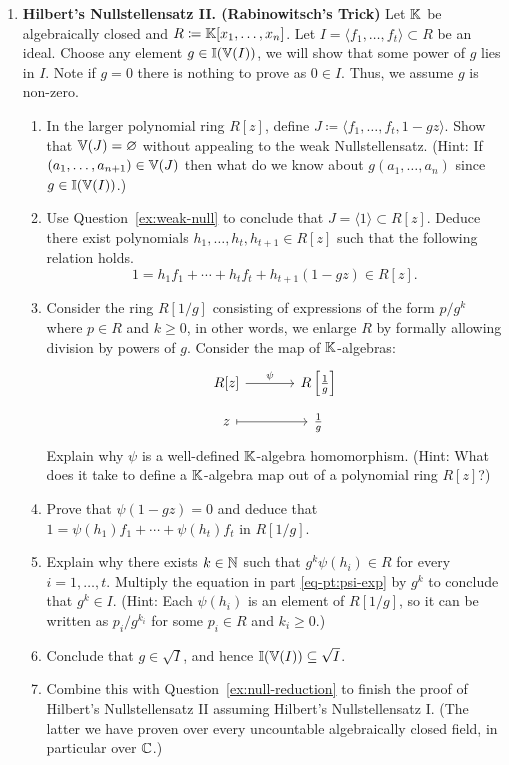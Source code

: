 \documentclass[12pt,reqno]{amsart}
\begin{document}
\begin{enumerate}[leftmargin=*]
\item \textbf{Hilbert's Nullstellensatz II. (Rabinowitsch's Trick)}  Let $\mathbb{K}$ be algebraically closed  and  $R\coloneqq \mathbb{K}[x_1,\ldots,x_n]$. Let $I=\langle f_1,\ldots,f_t\rangle \subset R$ be an ideal. Choose any element $g \in \mathbb{I}(\mathbb{V}(I))$, we will show that some power of $g$ lies in $I$. Note if $g=0$ there is nothing to prove as $0\in I$. Thus, we assume $g$ is non-zero. 
\begin{enumerate}[label=(\alph*),ref=\theenumi\alph*]
\item In the larger polynomial ring $R[z]$, define $J\coloneqq \langle f_1,\ldots,f_t,1-gz\rangle$. Show that $\mathbb{V}(J)=\varnothing$ without appealing to the weak Nullstellensatz. (Hint: If $(a_1,\ldots,a_{n+1}) \in \mathbb{V}(J)$ then what do we know about $g(a_1,\ldots,a_n)$ since $g\in \mathbb{I}(\mathbb{V}(I))$.)
\item Use Question~\ref{ex:weak-null} to conclude that $J=\langle 1\rangle \subset R[z]$. Deduce there exist polynomials $h_1,\ldots,h_t,h_{t+1} \in R[z]$ such that the following relation holds. 
\[
1=h_1f_1+\cdots+h_tf_t+h_{t+1}(1-gz) \in R[z].
\]
\item Consider the ring $R[1/g]$ consisting of expressions of the form $p/g^k$ where $p\in R$ and $k\geq 0$, in other words, we enlarge $R$ by formally allowing division by powers of $g$. Consider the map of $\mathbb{K}$-algebras:
\[
\begin{tikzcd}[row sep = .5em, column sep = 3.5em]
R[z]\arrow[r, "\psi"] & R\left[\frac{1}{g}\right] \\
z \arrow[r, mapsto] & \frac{1}{g}
\end{tikzcd}
\]
Explain why $\psi$ is a well-defined $\mathbb{K}$-algebra homomorphism. (Hint: What does it take to define a $\mathbb{K}$-algebra map out of a polynomial ring $R[z]$?)
\item\label{eq-pt:psi-exp} Prove that $\psi(1-gz)=0$ and deduce that $1=\psi(h_1)f_1+\cdots+\psi(h_t)f_t$ in $R[1/g]$.
\item Explain why there exists $k\in \mathbb{N}$ such that $g^k\psi(h_i)\in R$ for every $i=1,\ldots,t$. Multiply the equation in part \ref{eq-pt:psi-exp} by $g^k$ to conclude that $g^k\in I$. (Hint: Each $\psi(h_i)$ is an element of $R[1/g]$, so it can be written as $p_i/g^{k_i}$ for some $p_i\in R$ and $k_i\geq 0$.)
\item Conclude that $g\in \sqrt{I}$, and hence $\mathbb{I}(\mathbb{V}(I))\subseteq \sqrt{I}$.
\item Combine this with Question~\ref{ex:null-reduction} to finish the proof of Hilbert's Nullstellensatz II assuming Hilbert's Nullstellensatz I. (The latter we have proven over every uncountable algebraically closed field, in particular over $\mathbb{C}$.)
\end{enumerate}

\end{enumerate}
\end{document}
